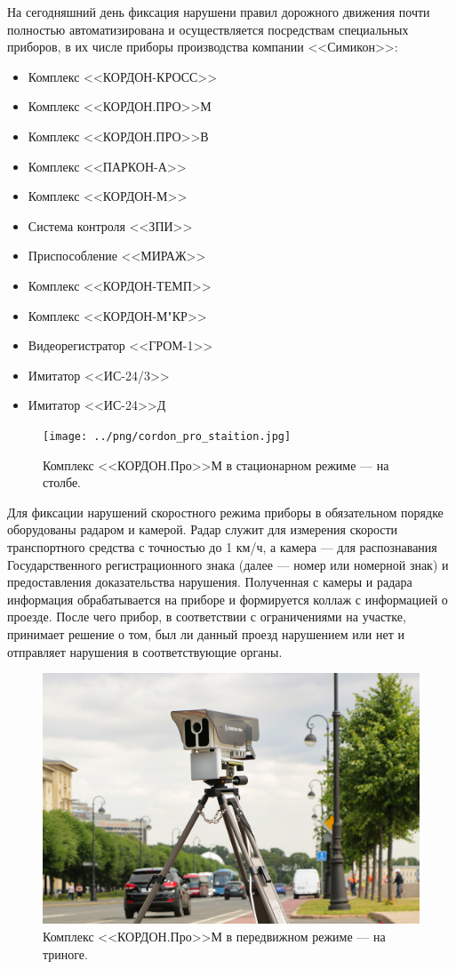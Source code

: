 \documentclass[specification,annotation,times]{itmo-student-thesis}
\begin{document}
	На сегодняшний день фиксация нарушени правил дорожного движения почти полностью автоматизирована и осуществляется посредствам специальных приборов, в их числе приборы производства компании <<Симикон>>:
	{\begin{itemize}
			\item Комплекс <<КОРДОН-КРОСС>>
			\item Комплекс <<КОРДОН.ПРО>>М
			\item Комплекс <<КОРДОН.ПРО>>В
			\item Комплекс <<ПАРКОН-А>>
			\item Комплекс <<КОРДОН-М>>
			\item Система контроля <<ЗПИ>>
			\item Приспособление <<МИРАЖ>>
			\item Комплекс <<КОРДОН-ТЕМП>>
			\item Комплекс <<КОРДОН-М"КР>>
			\item Видеорегистратор <<ГРОМ-1>>
			\item Имитатор <<ИС-24/3>>
			\item Имитатор <<ИС-24>>Д
	\end{itemize}}
	
	\begin{figure}[!ht]
		\caption{Комплекс <<КОРДОН.Про>>М в стационарном режиме --- на столбе.}\label{img:cordon-state}
		\texttt{[image: ../png/cordon\_pro\_staition.jpg]}
		\centering
	\end{figure}
	
	Для фиксации нарушений скоростного режима приборы в обязательном порядке оборудованы радаром и камерой. Радар служит для измерения скорости транспортного средства с точностью до 1 км/ч, а камера --- для распознавания Государственного регистрационного знака (далее --- номер или номерной знак) и предоставления доказательства нарушения. Полученная с камеры и радара информация обрабатывается на приборе и формируется коллаж с информацией о проезде. После чего прибор, в соответствии с ограничениями на участке, принимает решение о том, был ли данный проезд нарушением или нет и отправляет нарушения в соответствующие органы.
	
	\begin{figure}[!ht]
		\caption{Комплекс <<КОРДОН.Про>>М в передвижном режиме --- на триноге.}\label{img:cordon-move}
		\includegraphics[width=0.85\linewidth]{../png/cordon_pro_2.jpg}
		\centering
	\end{figure}
	
\end{document}
